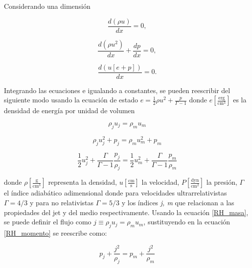 \documentclass[12pt,a4paper]{book}
\begin{document}
Considerando una dimensión

\begin{equation}
\dfrac{d \left( \rho u \right)}{d x} = 0,
\end{equation}

\begin{equation}
\dfrac{d \left( \rho u^2 \right)}{d x}+ \dfrac{d p}{d x}=0,
\end{equation}

\begin{equation}
\dfrac{d \left( u\left[e +p \right] \right)}{d x} = 0.
\end{equation}

\noindent Integrando las ecuaciones e igualando a constantes, se pueden reescribir del siguiente modo usando la ecuación de estado $e = \frac{1}{2} \rho u^2 + \frac{p}{\Gamma-1}$ donde 
$e \left[\frac{\mathrm{erg}}{\mathrm{cm^3}}\right]$ 
es la densidad de energía por unidad de volumen

\begin{equation}\label{RH_masa}
\rho_j u_j = \rho_m u_m
\end{equation}

\begin{equation}\label{RH_momento}
\rho_j u_{j}^{2}+p_j = \rho_m u_{m}^{2}+p_m
\end{equation}

\begin{equation}\label{RH_Energia}
\frac{1}{2} u_{j}^{2}+ \frac{\Gamma}{\Gamma-1} \frac{p_{j}}{\rho_{j}} =
 \frac{1}{2} u_{m}^{2}+ \frac{\Gamma}{\Gamma-1} \frac{p_{m}}{\rho_{m}}
\end{equation}

\noindent donde $\rho \left[\frac{\mathrm{g}}{\mathrm{cm}^3}\right]$ representa la densidad, $u \left[\frac{\mathrm{cm}}{\mathrm{s} }\right]$ la velocidad,  $P \left[\frac{\mathrm{dyn}}{\mathrm{cm}^2} \right]$ 
la presión, $\Gamma$ el índice adiabático adimensional donde para velocidades ultrarrelativistas $\Gamma = 4/3$ y para no relativistas $\Gamma = 5/3$ y los índices \textit{j, m} que  relacionan a las propiedades del 
jet y del medio respectivamente. Usando la ecuación   \ref{RH_masa}, se puede definir el flujo como $j \equiv \rho_j u_j = \rho_m u_m$, sustituyendo en la ecuación \ref{RH_momento} se reescribe como:

\begin{equation}\label{RH_momento_j}
p_{j}+\frac{j^2}{\rho_{j}}=p_{m}+\frac{j^2}{\rho_{m}}
\end{equation}
\end{document}
